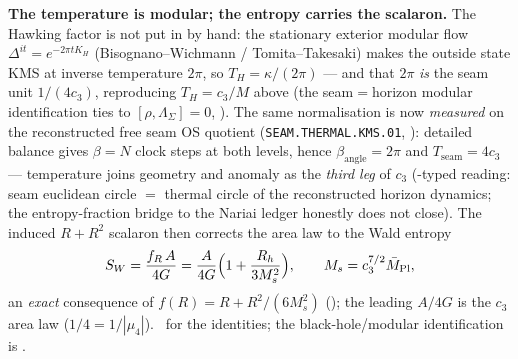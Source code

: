 \documentclass[11pt,a4paper]{article}
\newcommand{\cthree}{c_3}
\newcommand{\Mbar}{\bar M_{\mathrm{Pl}}}
\begin{document}
\par\smallskip\noindent\textbf{The temperature is modular; the entropy carries the scalaron.}
 The Hawking factor is not put in by hand: the stationary exterior
modular flow $\Delta^{it}=e^{-2\pi t K_H}$ (Bisognano--Wichmann / Tomita--Takesaki) makes the outside state
KMS at inverse temperature $2\pi$, so $T_H=\kappa/(2\pi)$ --- and that $2\pi$ \emph{is} the seam unit
$1/(4\cthree)$, reproducing $T_H=\cthree/M$ above (the seam$=$horizon modular identification ties to
$[\rho,\Lambda_\Sigma]=0$, ).
The same normalisation is now \emph{measured} on the reconstructed free seam OS quotient
(\texttt{SEAM.THERMAL.KMS.01}, ): detailed balance
gives $\beta=N$ clock steps at both levels, hence $\beta_{\mathrm{angle}}=2\pi$ and
$T_{\mathrm{seam}}=4\cthree$ --- temperature joins geometry and anomaly as the \emph{third leg}
of $\cthree$ (\mC-typed reading: seam euclidean circle $=$ thermal circle of the reconstructed
horizon dynamics; the entropy-fraction bridge to the Nariai ledger honestly does not close).
The induced $R+R^2$ scalaron then
corrects the area law to the Wald entropy
\[
  S_W=\frac{f_R\,A}{4G}=\frac{A}{4G}\Bigl(1+\frac{R_h}{3M_s^2}\Bigr),\qquad M_s=\cthree^{7/2}\Mbar,
\]
an \emph{exact} consequence of $f(R)=R+R^2/(6M_s^2)$ (); the leading $A/4G$ is the
$\cthree$ area law ($1/4=1/|\mu_4|$). \mE\ for the identities; the black-hole/modular identification is \mC.

\end{document}
